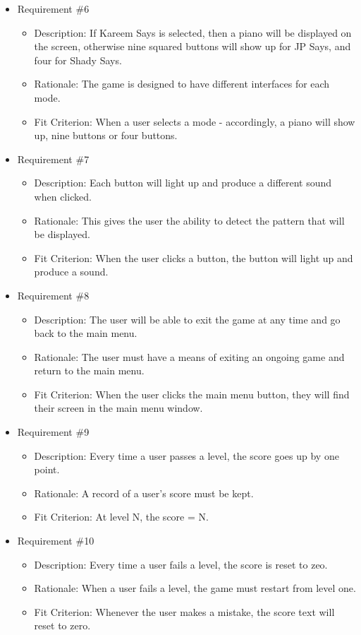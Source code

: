 \documentclass[12pt, titlepage]{article}
\begin{document}
\begin{itemize}
\item Requirement \#6
\begin{itemize}
\item Description: If Kareem Says is selected, then a piano will be displayed on the screen, otherwise nine squared buttons will show up for JP Says, and four for Shady Says.
\item Rationale: The game is designed to have different interfaces for each mode.
\item Fit Criterion: When a user selects a mode - accordingly, a piano will show up, nine buttons or four buttons. 
\end{itemize}

\item Requirement \#7
\begin{itemize}
\item Description: Each button will light up and produce a different sound when clicked.
\item Rationale: This gives the user the ability to detect the pattern that will be displayed.
\item Fit Criterion: When the user clicks a button, the button will light up and produce a sound.
\end{itemize}

\item Requirement \#8
\begin{itemize}
\item Description: The user will be able to exit the game at any time and go back to the main menu. 
\item Rationale: The user must have a means of exiting an ongoing game and return to the main menu.
\item Fit Criterion: When the user clicks the main menu button, they will find their screen in the main menu window.
\end{itemize}

\item Requirement \#9
\begin{itemize}
\item Description: Every time a user passes a level, the score goes up by one point.
\item Rationale: A record of a user's score must be kept. 
\item Fit Criterion: At level N, the score = N.
\end{itemize}

\item Requirement \#10
\begin{itemize}
\item Description: Every time a user fails a level, the score is reset to zeo.
\item Rationale: When a user fails a level, the game must restart from level one.
\item Fit Criterion: Whenever the user makes a mistake, the score text will reset to zero.
\end{itemize}


\end{itemize}
\end{document}
